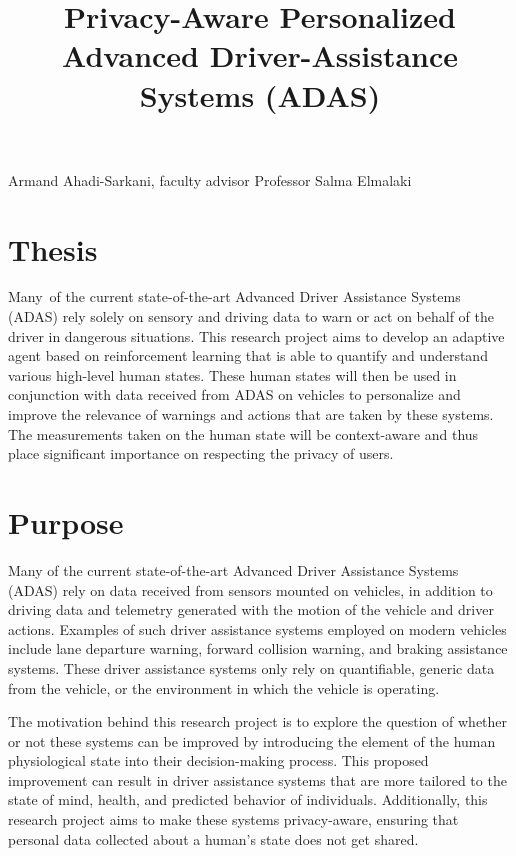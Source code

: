 \documentclass[12pt]{article}
\title{Privacy-Aware Personalized Advanced Driver-Assistance Systems (ADAS)\vspace{-3em}}
\date{}
\renewcommand{\_}{\kern-1.5pt\textunderscore\kern-1.5pt}
\begin{document}
\maketitle
\begin{Center}
Armand Ahadi-Sarkani, faculty advisor Professor Salma Elmalaki 
\end{Center}\par

\section{Thesis}
Many\ of the current state-of-the-art Advanced Driver Assistance Systems (ADAS) rely solely on sensory and driving data to warn or act on behalf of the driver in dangerous situations.  This research project aims to develop an adaptive agent based on reinforcement learning that is able to quantify and understand various high-level human states. These human states will then be used in conjunction with data received from ADAS on vehicles to personalize and improve the relevance of warnings and actions that are taken by these systems. The measurements taken on the human state will be context-aware and thus place significant importance on respecting the privacy of users.\par

\section{Purpose}
Many of the current state-of-the-art Advanced Driver Assistance Systems (ADAS) rely on data received from sensors mounted on vehicles, in addition to driving data and telemetry generated with the motion of the vehicle and driver actions. Examples of such driver assistance systems employed on modern vehicles include lane departure warning, forward collision warning, and braking assistance systems. These driver assistance systems only rely on quantifiable, generic data from the vehicle, or the environment in which the vehicle is operating. \par

\vspace{\baselineskip}
The motivation behind this research project is to explore the question of whether or not these systems can be improved by introducing the element of the human physiological state into their decision-making process. This proposed improvement can result in driver assistance systems that are more tailored to the state of mind, health, and predicted behavior of individuals. Additionally, this research project aims to make these systems privacy-aware, ensuring that personal data collected about a human’s state does not get shared.\par
\end{document}
